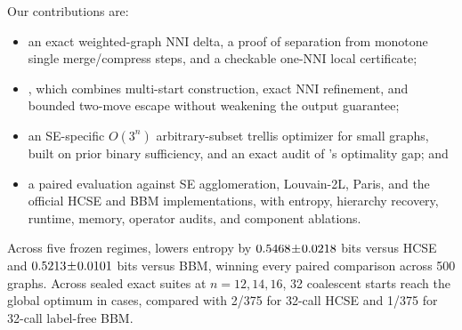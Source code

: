 Our contributions are:
\begin{itemize}
  \renewcommand{\labelitemi}{\textbullet}
  \item an exact weighted-graph NNI delta, a proof of separation from monotone
  single merge/compress steps, and a checkable one-NNI local certificate;
  \item \NEST, which combines multi-start construction, exact NNI refinement,
  and bounded two-move escape without weakening the output guarantee;
  \item an SE-specific $O(3^n)$ arbitrary-subset trellis optimizer for small
  graphs, built on prior binary sufficiency, and an exact audit of \NEST's
  optimality gap; and
  \item a paired evaluation against SE agglomeration, Louvain-2L, Paris, and
  the official HCSE and BBM implementations, with entropy, hierarchy recovery,
  runtime, memory, operator audits, and component ablations.
\end{itemize}

Across five frozen regimes, \NEST lowers entropy by
$0.5468\!\pm\!0.0218$ bits versus HCSE and
$0.5213\!\pm\!0.0101$ bits versus BBM, winning every paired
comparison across 500 graphs. Across sealed exact suites at $n=12,14,16$, 32
coalescent \NEST starts reach the global optimum in \ScaleCombinedExact{} cases,
compared with 2/375 for 32-call HCSE and 1/375 for 32-call label-free BBM.
